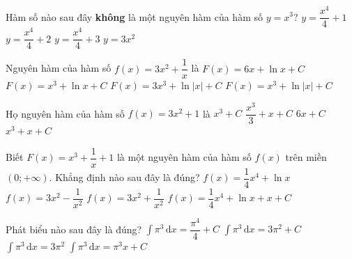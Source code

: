 \begin{ex}%
	Hàm số nào sau  đây \textbf{không} là một nguyên hàm của hàm số $ y=x^3$?
	\choice 
		{$  y=\dfrac{x^4}{4}+1$}
		{$  y=\dfrac{x^4}{4}+2$}
		{$ y=\dfrac{x^4}{4}+3$} 
		{\True  $ y=3x^2$}
\end{ex}

\begin{ex}%
	Nguyên hàm của hàm số $f(x)=3  x^{2}+\dfrac{1}{x}$ là
	\choice 
		{$F(x)=6 x+\ln  x+C$}
		 {$F(x)=x^{3}+\ln x+C$}
		{$F(x)=3  x^{3}+\ln |x|+C$}
		 {\True $F(x)=x^{3}+\ln |x|+C$}
\end{ex}

\begin{ex}%
	Họ nguyên hàm của hàm số $f(x)=3x^2+1$  là
	 \choice
		 {$x^3+C$}
		{$\dfrac{x^3}{3}+x+C$} 
		 {$6x+C$}
		{\True $x^3+x+C$} 
\end{ex}

\begin{ex}%
	Biết $F(x)=x^3+\dfrac{1}{x}+1$ là một nguyên hàm của hàm số $f(x)$ trên miền $(0;+\infty)$. Khẳng định nào sau  đây là đúng?
	 \choice
		 {$f(x)=\dfrac{1}{4} x^4+\ln x$}
		 {\True $f(x)=3x^2-\dfrac{1}{x^2}$}
		 {$f(x)=3x^2+\dfrac{1}{x^2}$}
		 {$f(x)=\dfrac{1}{4} x^4+\ln x+x+C$}
\end{ex}

\begin{ex}%
	Phát biểu nào sau đây  là đúng?
	\choice 
		{$\displaystyle\int \pi^3\mathrm{\,d}x  = \dfrac{\pi^4}{4}+C$}
		{$\displaystyle\int  \pi^3 \mathrm{\,d}x = 3\pi^2+C$}
		{$\displaystyle\int  \pi^3 \mathrm{\,d}x = 3\pi^2$}
		{\True $\displaystyle\int  \pi^3 \mathrm{\,d}x = \pi^3x+C$}
\end{ex}

